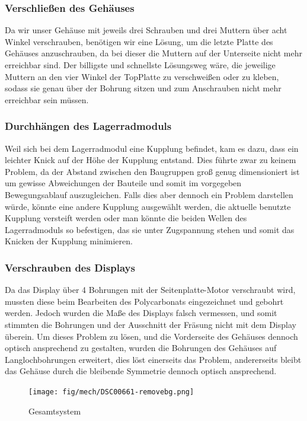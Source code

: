 \subsubsection{Verschließen des Gehäuses}
Da wir unser Gehäuse mit jeweils drei Schrauben und drei Muttern über acht Winkel verschrauben, benötigen
wir eine Lösung, um die letzte Platte des Gehäuses anzuschrauben, da bei dieser die Muttern
auf der Unterseite nicht mehr erreichbar sind.
Der billigste und schnellste Lösungsweg wäre,
die jeweilige Muttern an den vier Winkel der TopPlatte zu verschweißen oder zu kleben, sodass sie genau über der
Bohrung sitzen und zum Anschrauben nicht mehr erreichbar sein müssen.

\subsubsection{Durchhängen des Lagerradmoduls}
Weil sich bei dem Lagerradmodul eine Kupplung befindet, kam es dazu, dass ein leichter Knick
auf der Höhe der Kupplung entstand.
Dies führte zwar zu keinem Problem, da der Abstand zwischen den Baugruppen groß genug dimensioniert ist um gewisse Abweichungen der Bauteile und somit im
vorgegeben Bewegungsablauf auszugleichen.
Falls dies aber dennoch ein Problem darstellen würde, könnte eine andere Kupplung ausgewählt werden, die aktuelle benutzte Kupplung versteift werden oder
man könnte die beiden Wellen des Lagerradmoduls so befestigen, das sie unter
Zugspannung stehen und somit das Knicken der Kupplung minimieren.

\subsubsection{Verschrauben des Displays}
Da das Display über 4 Bohrungen mit der Seitenplatte-Motor verschraubt wird, mussten diese
beim Bearbeiten des Polycarbonats eingezeichnet und gebohrt werden. Jedoch wurden
die Maße des Displays falsch vermessen, und somit stimmten die Bohrungen und der Ausschnitt
der Fräsung nicht mit dem Display überein. Um dieses Problem zu lösen, und die
Vorderseite des Gehäuses dennoch optisch ansprechend zu gestalten, wurden die Bohrungen
des Gehäuses auf Langlochbohrungen erweitert, dies löst einerseits das Problem, andererseits
bleibt das Gehäuse durch die bleibende Symmetrie dennoch optisch ansprechend.

\begin{figure}[H]
    \centering
    \texttt{[image: fig/mech/DSC00661-removebg.png]}
    \caption{Gesamtsystem}
    \label{fig:GesamtsystemEcht}
\end{figure}

